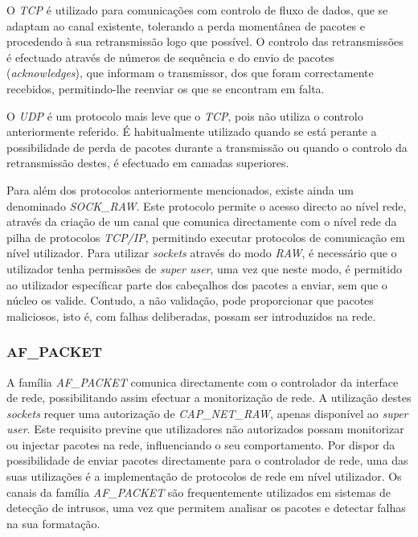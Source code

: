 O \textit{TCP} é utilizado para comunicações com controlo de fluxo de dados, que se adaptam ao canal existente, tolerando a perda momentânea de pacotes e procedendo à sua retransmissão logo que possível.
O controlo das retransmissões é efectuado através de números de sequência e do envio de pacotes (\textit{acknowledges}), que informam o transmissor, dos que foram correctamente recebidos, permitindo-lhe reenviar os que se encontram em falta.

O \textit{UDP} é um protocolo mais leve que o \textit{TCP}, pois não utiliza o controlo anteriormente referido.
É habitualmente utilizado quando se está perante a possibilidade de perda de pacotes durante a transmissão ou quando o controlo da retransmissão destes, é efectuado em camadas superiores.

Para além dos protocolos anteriormente mencionados, existe ainda um denominado \textit{SOCK\_RAW}.
Este protocolo permite o acesso directo ao nível rede, através da criação de um canal que comunica directamente com o nível rede da pilha de protocolos \textit{TCP/IP}, permitindo executar protocolos de comunicação em nível utilizador.
Para utilizar \textit{sockets} através do modo \textit{RAW}, é necessário que o utilizador tenha permissões de \textit{super user}, uma vez que neste modo, é permitido ao utilizador específicar parte dos cabeçalhos dos pacotes a enviar, sem que o núcleo os valide.
Contudo, a não validação, pode proporcionar que pacotes maliciosos, isto é, com falhas deliberadas, possam ser introduzidos na rede.
 
\subsubsection{AF\_PACKET}
\label{subsub:af_packet}

A família \textit{AF\_PACKET} comunica directamente com o controlador da interface de rede, possibilitando assim efectuar a monitorização de rede.
A utilização destes \textit{sockets} requer uma autorização de \textit{CAP\_NET\_RAW}, apenas disponível ao \textit{super user}.
Este requisito previne que utilizadores não autorizados possam monitorizar ou injectar pacotes na rede, influenciando o seu comportamento.
Por dispor da possibilidade de enviar pacotes directamente para o controlador de rede, uma das suas utilizações é a implementação de protocolos de rede em nível utilizador.
Os canais da família \textit{AF\_PACKET} são frequentemente utilizados em sistemas de detecção de intrusos, uma vez que permitem analisar os pacotes e detectar falhas na sua formatação.

